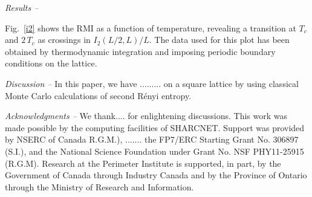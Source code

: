 \documentclass[a4paper,aps,prl,reprint,superscriptaddress,twocolumn,floatfix]{revtex4-1}
\begin{document}
{\em Results --}

Fig.~\ref{i2} shows the RMI as a function of temperature,
revealing a transition at $T_c$ and $2 \,T_c$ as crossings in $I_2(L/2, L)  /L$.
The data used for this plot has been obtained by thermodynamic integration and imposing periodic boundary conditions on the lattice.













{\em Discussion --}
In this paper, we have ......... on a square lattice by using classical Monte Carlo calculations of second R{\'e}nyi entropy.  


{\em Acknowledgments --} We thank.... for enlightening discussions. 
 This work was made possible by the computing facilities of SHARCNET. Support was provided 
by NSERC of Canada R.G.M.), ....... the FP7/ERC Starting Grant No. 306897 (S.I.), 
and the National Science Foundation under Grant No. NSF PHY11-25915 (R.G.M).
Research at the Perimeter Institute is supported, in
part, by the Government of Canada through Industry Canada
and by the Province of Ontario through the Ministry of
Research and Information.


\end{document}
